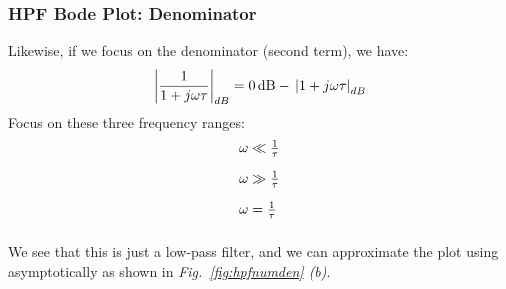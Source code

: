 \subsubsection{HPF Bode Plot: Denominator}
Likewise, if we focus on the denominator (second term), we have:
    \begin{equation} 
        {\left| {\frac{1}{{1 + j\omega \tau }}} \right|_{dB}} = 0\,{\rm{dB}} - \,{\left| {1 + j\omega \tau } \right|_{dB}}
    \end{equation}
Focus on these three frequency ranges:
    \begingroup
    \Large
        \begin{equation*}
            \begin{array}{l}
                \vspace{0.35cm}
                \omega \ll \frac{1}{\tau}\\
                \vspace{0.35cm}
                \omega \gg \frac{1}{\tau}\\
                \vspace{0.35cm}
                \omega = \frac{1}{\tau}
            \end{array}
        \end{equation*}
    \endgroup
We see that this is just a low-pass filter, and we can approximate the plot using asymptotically as shown in \emph{Fig.~\ref{fig:hpfnumden} (b)}.
\newpage
